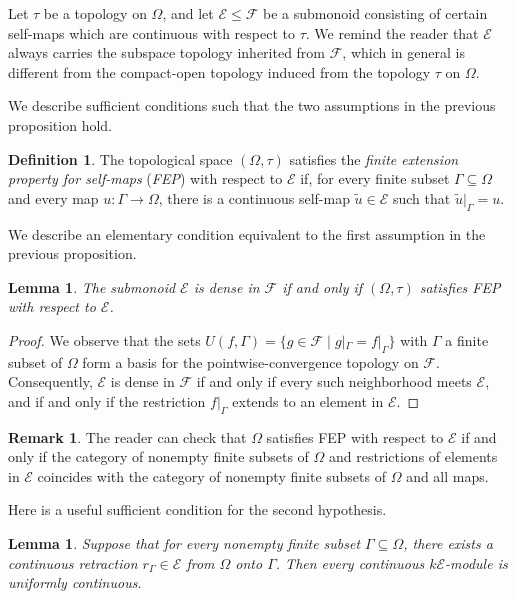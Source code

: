 \documentclass[10pt, reqno]{amsart}
\theoremstyle{plain}
\newtheorem{lemma}[theorem]{Lemma}
\numberwithin{equation}{section}
\theoremstyle{definition}
\newtheorem{definition}[theorem]{Definition}
\newtheorem{remark}[theorem]{Remark}
\newcommand{\E}{\mathscr E}
\begin{document}
Let $\tau$ be a topology on $\Omega$, and let $\E \leqslant \mathscr{F}$ be a submonoid consisting of certain self-maps which are continuous with respect to $\tau$. We remind the reader that $\E$ always carries the subspace topology inherited from $\mathscr{F}$, which in general is different from the compact-open topology induced from the topology $\tau$ on $\Omega$.

We describe sufficient conditions such that the two assumptions in the previous proposition hold.

\begin{definition}\label{def:FEP}
The topological space $(\Omega, \tau)$ satisfies the \emph{finite extension property for self-maps} (\emph{FEP}) with respect to $\E$ if, for every finite subset $\Gamma \subseteq \Omega$ and every map $u: \Gamma \to \Omega$, there is a continuous self-map $\widetilde{u} \in \E$ such that
$\widetilde{u}|_{\Gamma} = u$.
\end{definition}

We describe an elementary condition equivalent to the first assumption in the previous proposition.

\begin{lemma}\label{lem:FEP-dense}
The submonoid $\E$ is dense in $\mathscr{F}$ if and only if $(\Omega, \tau)$ satisfies FEP with respect to $\E$.
\end{lemma}

\begin{proof}
We observe that the sets $ U(f, \Gamma) = \{g \in \mathscr{F} \mid g|_\Gamma = f|_\Gamma\}$ with $\Gamma$ a finite subset of $\Omega$ form a basis for the pointwise-convergence topology on $\mathscr{F}$. Consequently, $\E$ is dense in $\mathscr{F}$ if and only if every such neighborhood meets $\E$, and if and only if the restriction $f|_\Gamma$ extends to an element in $\E$.
\end{proof}

\begin{remark}
The reader can check that $\Omega$ satisfies FEP with respect to $\E$ if and only if the category of nonempty finite subsets of $\Omega$ and restrictions of elements in $\E$ coincides with the category of nonempty finite subsets of $\Omega$ and all maps.
\end{remark}

Here is a useful sufficient condition for the second hypothesis.

\begin{lemma}\label{lem:finite-retractions-FA}
Suppose that for every nonempty finite subset $\Gamma\subseteq\Omega$, there exists a continuous retraction $r_\Gamma\in\E$ from $\Omega$ onto $\Gamma$. Then every continuous $k\E$-module is uniformly continuous.
\end{lemma}
\end{document}
